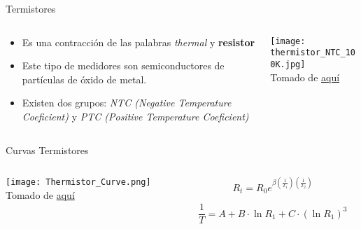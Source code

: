 \documentclass[aspectratio=169]{beamer}
\begin{document}
\begin{frame}{Termistores}
    \begin{columns}[c, onlytextwidth]
        \begin{column}{0.55\textwidth}
            \begin{itemize}
                \item Es una contracción de las palabras \textit{thermal} y \textbf{resistor} 
                \item Este tipo de medidores son semiconductores de partículas de óxido de metal. 
                \item Existen dos grupos: \textit{NTC (Negative Temperature Coeficient) } y \textit{PTC (Positive Temperature Coeficient)}
            \end{itemize}
        \end{column}
        \begin{column}{0.40\textwidth}
           \texttt{[image: thermistor\_NTC\_100K.jpg]}
            \\ \tiny{Tomado de \href{https://spool3d.ca/ntc-100k-thermistor-with-terminal/}{aquí}}
        \end{column}
    \end{columns}
\end{frame}
\begin{frame}{Curvas Termistores}
    \begin{columns}[c, onlytextwidth]
        \begin{column}{0.55\textwidth}
             \texttt{[image: Thermistor\_Curve.png]}
            \\ \tiny{Tomado de \href{https://www.researchgate.net/publication/309267235_A_Simple_Thermistor_Design_for_Industrial_Temperature_Measurement/figures?lo=1&utm_source=google&utm_medium=organichttps://spool3d.ca/ntc-100k-thermistor-with-terminal/}{aquí}}
        \end{column}
        \begin{column}{0.40\textwidth}
        \begin{equation*}
            R_t=R_0e^{\beta(\frac{1}{T_1})(\frac{1}{T_2})}
        \end{equation*}
        
        \begin{equation*}
            \frac{1}{T}=A+B\cdot \ln R_1 + C \cdot (\ln R_1)^3
        \end{equation*}
          
        \end{column}
    \end{columns}
\end{frame}
\end{document}
